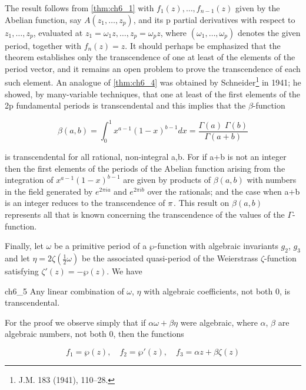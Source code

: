 The result follows from \autoref{thm:ch6_1} with $f_1(z), \dots, f_{n-1}(z)$ given by the Abelian function, say $A(z_1, \dots, z_p)$, and its p partial derivatives with respect to $z_1, \dots, z_p$, evaluated at $z_1 = \omega_1 z, \dots, z_p = \omega_p z$, where $(\omega_1, \dots, \omega_p)$ denotes the given period, together with $f_n(z) = z$. It should perhaps be emphasized that the theorem establishes only the transcendence of one at least of the elements of the period vector, and it remains an open problem to prove the transcendence of each such element. An analogue of \autoref{thm:ch6_4} was obtained by Schneider\footnote{J.M. 183 (1941), 110--28.} in 1941; he showed, by many-variable techniques, that one at least of the first elements of the 2p fundamental periods is transcendental and this implies that the $\beta$-function

\[\beta(a,b) = \int_0^1 x^{a-1} (1-x)^{b-1} dx = \frac{\Gamma(a) \; \Gamma(b)}{\Gamma(a+b)}\]

is transcendental for all rational, non-integral a,b. For if a+b is not an integer then the first elements of the periods of the Abelian function arising from the integration of $x^{a-1}(1-x)^{b-1}$ are given by products of $\beta(a,b)$ with numbers in the field generated by $e^{2\pi ia}$ and $e^{2\pi ib}$ over the rationals; and the case when a+b is an integer reduces to the transcendence of $\pi\index{transcendence of  $\pi$}$. This result on $\beta(a,b)$ represents all that is known concerning the transcendence of the values of the $\Gamma$-function.

Finally, let $\omega$ be a primitive period of a $\wp$-function with algebraic invariants $g_2$, $g_3$ and let $\eta = 2\zeta(\frac{1}{2}\omega)$ be the associated quasi-period of the Weierstrass $\zeta$-function satisfying $\zeta'(z) = -\wp(z)$. We have

\begin{mythm}{}{ch6_5}
Any linear combination of $\omega$, $\eta$ with algebraic coefficients, not both 0, is transcendental.
\end{mythm}

For the proof we observe simply that if $\alpha\omega + \beta\eta$ were algebraic, where $\alpha$, $\beta$ are algebraic numbers, not both 0, then the functions

\[f_1 = \wp(z), \quad f_2 = \wp'(z), \quad f_3 = \alpha z + \beta \zeta(z)\]

